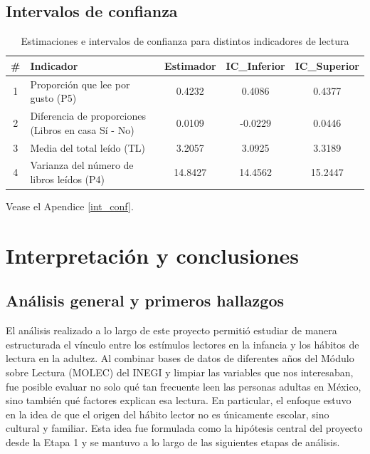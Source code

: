 \documentclass[aps,reprint]{revtex4-2}
\begin{document}
\subsection{Intervalos de confianza}
\begin{widetext}
  
\begin{table}[H]
\centering
\caption{Estimaciones e intervalos de confianza para distintos indicadores de lectura}
\begin{tabular}{clccc}
\hline
\textbf{\#} & \textbf{Indicador} & \textbf{Estimador} & \textbf{IC\_Inferior} & \textbf{IC\_Superior} \\ 
\hline
1 & Proporción que lee por gusto (P5) & 0.4232 & 0.4086 & 0.4377 \\
2 & Diferencia de proporciones (Libros en casa Sí - No) & 0.0109 & -0.0229 & 0.0446 \\
3 & Media del total leído (TL) & 3.2057 & 3.0925 & 3.3189 \\
4 & Varianza del número de libros leídos (P4) & 14.8427 & 14.4562 & 15.2447 \\
\hline
\end{tabular}
\end{table}

\end{widetext}

Vease el Apendice \ref{int_conf}.


\section{Interpretación y conclusiones}

\subsection*{Análisis general y primeros hallazgos}

El análisis realizado a lo largo de este proyecto permitió estudiar de manera estructurada el vínculo entre los estímulos lectores en la infancia y los hábitos de lectura en la adultez. Al combinar bases de datos de diferentes años del Módulo sobre Lectura (MOLEC) del INEGI y limpiar las variables que nos interesaban, fue posible evaluar no solo qué tan frecuente leen las personas adultas en México, sino también qué factores explican esa lectura. En particular, el enfoque estuvo en la idea de que el origen del hábito lector no es únicamente escolar, sino cultural y familiar. Esta idea fue formulada como la hipótesis central del proyecto desde la Etapa 1 y se mantuvo a lo largo de las siguientes etapas de análisis.
\end{document}
